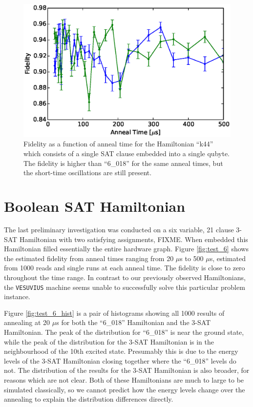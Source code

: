 \begin{figure}
	\includegraphics{img/k44.eps}
	\caption[Single K44 Fidelity]{Fidelity as a function of anneal time for the Hamiltonian ``k44'' which consists of a single SAT clause embedded into a single qubyte.  The fidelity is higher than ``6\_018'' for the same anneal times, but the short-time oscillations are still present.}
	\label{fig:k44_comparison}
\end{figure}

\section{Boolean SAT Hamiltonian}
The last preliminary investigation was conducted on a six variable, 21 clause 3-SAT Hamiltonian with two satisfying assignments, FIXME.  When embedded this Hamiltonian filled essentially the entire hardware graph.  Figure \ref{fig:test_6} shows the estimated fidelity from anneal times ranging from 20 $\mu$s to 500 $\mu$s, estimated from 1000 reads and single runs at each anneal time.  The fidelity is close to zero throughout the time range.  In contrast to our previously observed Hamiltonians, the \texttt{VESUVIUS} machine seems unable to successfully solve this particular problem instance.  

Figure \ref{fig:test_6_hist} is a pair of histograms showing all 1000 results of annealing at 20 $\mu$s for both the ``6\_018'' Hamiltonian and the 3-SAT Hamiltonian.  The peak of the distribution for ``6\_018'' is near the ground state, while the peak of the distribution for the 3-SAT Hamiltonian is in the neighbourhood of the 10th excited state.  Presumably this is due to the energy levels of the 3-SAT Hamiltonian closing together where the ``6\_018'' levels do not.  The distribution of the results for the 3-SAT Hamiltonian is also broader, for reasons which are not clear.  Both of these Hamiltonians are much to large to be simulated classically, so we cannot predict how the energy levels change over the annealing to explain the distribution differences directly.

